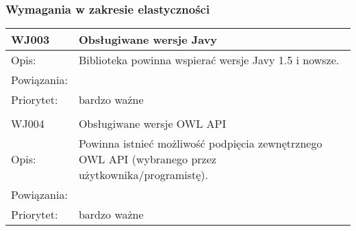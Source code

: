 

\subsubsection{Wymagania w zakresie elastyczności}


\begin{center}

\begin{tabular}{|m{3cm}|m{9cm}|} \hline

WJ003 & Obsługiwane wersje Javy \\ \hline
Opis: & Biblioteka powinna wspierać wersje Javy 1.5 i nowsze.\\ \hline
Powiązania: &  \\ \hline
Priorytet: & bardzo ważne \\ \hline

\multicolumn{2}{c}{} \\
 \hline

WJ004 & Obsługiwane wersje OWL API \\ \hline
Opis: & Powinna istnieć możliwość podpięcia zewnętrznego OWL API (wybranego przez użytkownika/programistę).\\ \hline
Powiązania: &  \\ \hline
Priorytet: & bardzo ważne \\ \hline

\end{tabular}

\end{center}










